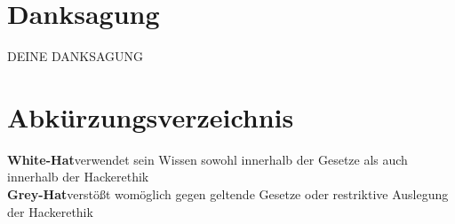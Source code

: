 \documentclass[FinalThesis]{Deckblatt}
\author{\name}
\title{\titelDerArbeit}
\subtitle{\subTitelDerAbeit}
\date{\@myDate}
\begin{document}
\maketitle
{}
\pagestyle{plain}
\renewcommand*{\abstractname}{\Large Abstract}

\begin{abstract}
DEIN ABSTRACT
\end{abstract}

\chapter*{Danksagung}
DEINE DANKSAGUNG

\tableofcontents


\printbibliography
\listoffigures
\listoftables
{\let\cleardoublepage\relax \chapter*{Abkürzungsverzeichnis}}
\textbf{White-Hat}\dotfill verwendet sein Wissen sowohl innerhalb der Gesetze als auch innerhalb der Hackerethik\\
\textbf{Grey-Hat}\dotfill verstößt womöglich gegen geltende Gesetze oder restriktive Auslegung der Hackerethik\\
\appendix


\end{document}
